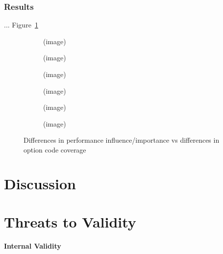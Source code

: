 \subsubsection{Results} ... Figure~\ref{fig:diff_performance_option_coverage}\\

\begin{figure}
	\centering
	\begin{subfigure}{0.33\textwidth}
		\centering
		(image)
		\caption{\batik}
	\end{subfigure}
	\begin{subfigure}{0.33\textwidth}
		\centering
		(image)
		\caption{\dconvert}
	\end{subfigure}
	\begin{subfigure}{0.33\textwidth}
		\centering
		(image)
		\caption{\htwo}
	\end{subfigure}
	\begin{subfigure}{0.33\textwidth}
		\centering
		(image)
		\caption{\jumper}
	\end{subfigure}
	\begin{subfigure}{0.33\textwidth}
		\centering
		(image)
		\caption{\jadx}
	\end{subfigure}
	\begin{subfigure}{0.33\textwidth}
		\centering
		(image)
		\caption{\kanzi}
	\end{subfigure}
	\caption{Differences in performance influence/importance vs differences in option code coverage}
	\label{fig:diff_performance_option_coverage}
\end{figure}


\section{Discussion}

\section{Threats to Validity}\label{sec:threats}
\paragraph{Internal Validity}\label{sec:internal_validity}

